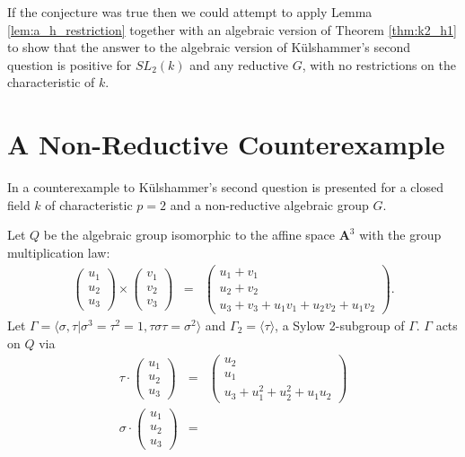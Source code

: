 If the conjecture was true then we could attempt to apply Lemma \ref{lem:a_h_restriction} together with an algebraic version of Theorem \ref{thm:k2_h1} to show that the answer to the algebraic version of K\"ulshammer's second question is positive for $SL_2(k)$ and any reductive $G$, with no restrictions on the characteristic of $k$.

\section{A Non-Reductive Counterexample}
In \cite{slodowy1997two} a counterexample to K\"ulshammer's second question is presented for a closed field $k$ of characteristic $p = 2$ and a non-reductive algebraic group $G$.
\begin{example} Let $Q$ be the algebraic group isomorphic to the affine space $\mathbf{A}^3$ with the group multiplication law:
\begin{eqnarray*}
	\left(\begin{matrix} u_1 \\ u_2 \\ u_3 \end{matrix}\right) \times
	\left(\begin{matrix} v_1 \\ v_2 \\ v_3 \end{matrix}\right) &=&
	\left(\begin{matrix} u_1 + v_1 \\ u_2 + v_2 \\ u_3 + v_3 + u_1v_1 + u_2v_2 + u_1v_2 \end{matrix}\right).
\end{eqnarray*}
Let $\Gamma = \langle \sigma, \tau | \sigma^3 = \tau^2 = 1, \tau\sigma\tau = \sigma^2 \rangle$ and $\Gamma_2 = \langle \tau \rangle$, a Sylow 2-subgroup of $\Gamma$. $\Gamma$ acts on $Q$ via
\begin{eqnarray*}
	\tau \cdot \left(\begin{matrix} u_1 \\ u_2 \\ u_3 \end{matrix} \right) &=&
	\left(\begin{matrix} u_2 \\ u_1 \\ u_3 + u_1^2 + u_2^2 + u_1u_2 \end{matrix} \right) \\
	\sigma \cdot \left(\begin{matrix} u_1 \\ u_2 \\ u_3 \end{matrix} \right) &=&

\end{eqnarray*}
\end{example}
